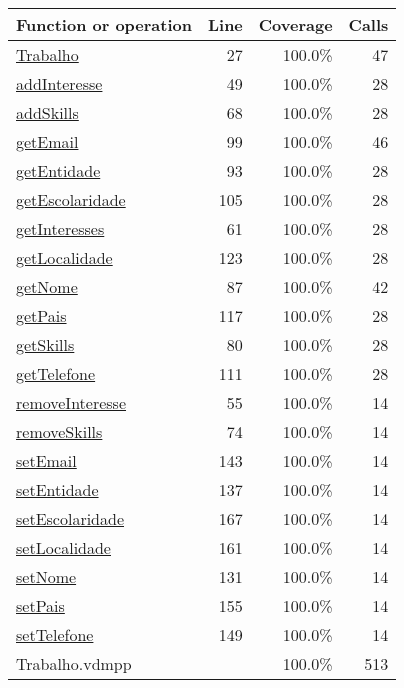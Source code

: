 \bigskip
\begin{longtable}{|l|r|r|r|}
\hline
Function or operation & Line & Coverage & Calls \\
\hline
\hline
\hyperref[Trabalho:27]{Trabalho} & 27&100.0\% & 47 \\
\hline
\hyperref[addInteresse:49]{addInteresse} & 49&100.0\% & 28 \\
\hline
\hyperref[addSkills:68]{addSkills} & 68&100.0\% & 28 \\
\hline
\hyperref[getEmail:99]{getEmail} & 99&100.0\% & 46 \\
\hline
\hyperref[getEntidade:93]{getEntidade} & 93&100.0\% & 28 \\
\hline
\hyperref[getEscolaridade:105]{getEscolaridade} & 105&100.0\% & 28 \\
\hline
\hyperref[getInteresses:61]{getInteresses} & 61&100.0\% & 28 \\
\hline
\hyperref[getLocalidade:123]{getLocalidade} & 123&100.0\% & 28 \\
\hline
\hyperref[getNome:87]{getNome} & 87&100.0\% & 42 \\
\hline
\hyperref[getPais:117]{getPais} & 117&100.0\% & 28 \\
\hline
\hyperref[getSkills:80]{getSkills} & 80&100.0\% & 28 \\
\hline
\hyperref[getTelefone:111]{getTelefone} & 111&100.0\% & 28 \\
\hline
\hyperref[removeInteresse:55]{removeInteresse} & 55&100.0\% & 14 \\
\hline
\hyperref[removeSkills:74]{removeSkills} & 74&100.0\% & 14 \\
\hline
\hyperref[setEmail:143]{setEmail} & 143&100.0\% & 14 \\
\hline
\hyperref[setEntidade:137]{setEntidade} & 137&100.0\% & 14 \\
\hline
\hyperref[setEscolaridade:167]{setEscolaridade} & 167&100.0\% & 14 \\
\hline
\hyperref[setLocalidade:161]{setLocalidade} & 161&100.0\% & 14 \\
\hline
\hyperref[setNome:131]{setNome} & 131&100.0\% & 14 \\
\hline
\hyperref[setPais:155]{setPais} & 155&100.0\% & 14 \\
\hline
\hyperref[setTelefone:149]{setTelefone} & 149&100.0\% & 14 \\
\hline
\hline
Trabalho.vdmpp & & 100.0\% & 513 \\
\hline
\end{longtable}

